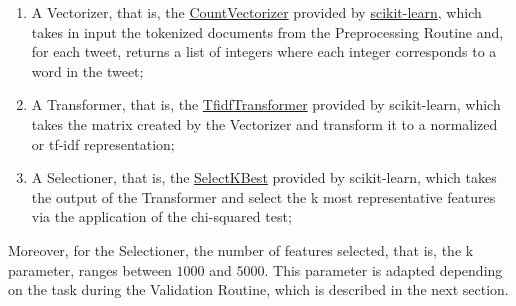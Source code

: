 \documentclass[11pt,twocolumn]{article}
\begin{document}
            \begin{enumerate}
                \item A Vectorizer, that is, the
                \href{https://scikit-learn.org/stable/modules/generated/sklearn.feature_extraction.text.CountVectorizer.html#sklearn.feature_extraction.text.CountVectorizer}{CountVectorizer}
                provided by
                \href{https://scikit-learn.org/stable/index.html}{scikit-learn}, which takes in input
                the tokenized documents from the Preprocessing Routine and, for each tweet, returns a list
                of integers where each integer corresponds to a word in the tweet;
                \item A Transformer, that is, the
                \href{https://scikit-learn.org/stable/modules/generated/sklearn.feature_extraction.text.TfidfVectorizer.html#sklearn.feature_extraction.text.TfidfVectorizer}{TfidfTransformer}
                provided by scikit-learn, which takes the matrix created by the Vectorizer and
                transform it to a normalized or tf-idf representation;
                \item A Selectioner, that is, the
                \href{https://scikit-learn.org/stable/modules/generated/sklearn.feature_selection.SelectKBest.html}{SelectKBest} provided by scikit-learn, which
                takes the output of the Transformer and select the k most representative features via the
                application of the chi-squared test;
            \end{enumerate}

            \noindent
            Moreover, for the Selectioner, the number of features selected, that is, the k parameter,
            ranges between $1000$ and $5000$. This parameter is adapted depending on the task during the
            Validation Routine, which is described in the next section.
\end{document}
